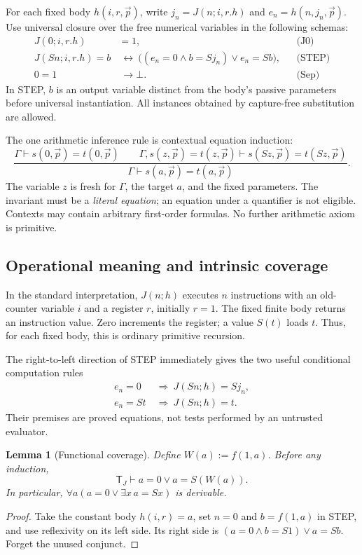 \documentclass[11pt,letterpaper]{article}
\newtheorem{lemma}[theorem]{Lemma}
\theoremstyle{definition}\newtheorem{definition}[theorem]{Definition}
\theoremstyle{remark}\newtheorem{remark}[theorem]{Remark}
\newcommand{\TJ}{\mathsf T_J}
\begin{document}
For each fixed body $h(i,r,\vec p)$, write $j_n=J(n;i,r.h)$ and
$e_n=h(n,j_n,\vec p)$. Use universal closure over the free numerical
variables in the following schemas:
\begin{align}
 J(0;i,r.h)&=1, &&\text{(J0)}\label{ax:J0}\\
 J(Sn;i,r.h)=b&\ \leftrightarrow\
       \bigl((e_n=0\land b=Sj_n)\lor e_n=Sb\bigr),
       &&\text{(STEP)}\label{ax:step}\\
 0=1&\ \to\bot. &&\text{(Sep)}\label{ax:sep}
\end{align}
In STEP, $b$ is an output variable distinct from the body's passive
parameters before universal instantiation. All instances obtained by
capture-free substitution are allowed.

The one arithmetic inference rule is contextual equation induction:
\[
 \frac{\Gamma\vdash s(0,\vec p)=t(0,\vec p)\qquad
       \Gamma,s(z,\vec p)=t(z,\vec p)
                \vdash s(Sz,\vec p)=t(Sz,\vec p)}
      {\Gamma\vdash s(a,\vec p)=t(a,\vec p)}.
 \tag{EI}\label{rule:EI}
\]
The variable $z$ is fresh for $\Gamma$, the target $a$, and the fixed
parameters. The invariant must be a \emph{literal equation}; an equation
under a quantifier is not eligible. Contexts may contain arbitrary
first-order formulas. No further arithmetic axiom is primitive.

\subsection{Operational meaning and intrinsic coverage}

In the standard interpretation, $J(n;h)$ executes $n$ instructions with
an old-counter variable $i$ and a register $r$, initially $r=1$.
The fixed finite body returns an instruction value. Zero increments
the register; a value $S(t)$ loads $t$. Thus, for each fixed body,
this is ordinary primitive recursion.

The right-to-left direction of STEP immediately gives the two useful
conditional computation rules
\begin{align}
 e_n=0&\ \Longrightarrow\ J(Sn;h)=Sj_n,\label{rule:inc}\\
 e_n=St&\ \Longrightarrow\ J(Sn;h)=t.\label{rule:load}
\end{align}
Their premises are proved equations, not tests performed by an
untrusted evaluator.

\begin{lemma}[Functional coverage]\label{lem:coverage}
Define $W(a):=f(1,a)$. Before any induction,
\[
 \TJ\vdash a=0\lor a=S(W(a)).
\]
In particular, $\forall a(a=0\lor\exists x\,a=Sx)$ is derivable.
\end{lemma}
\begin{proof}
Take the constant body $h(i,r)=a$, set $n=0$ and $b=f(1,a)$ in
STEP, and use reflexivity on its left side. Its right side is
$(a=0\land b=S1)\lor a=Sb$. Forget the unused conjunct.
\end{proof}
\end{document}
